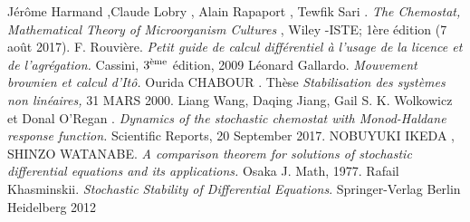 \documentclass[12pt,a4paper]{report}%
\begin{document}
\begin{mycomment}
\newpage
\begin{thebibliography}{Dillo 83}

  Jérôme Harmand ,Claude Lobry , Alain Rapaport , Tewfik Sari .\emph{ The Chemostat, Mathematical Theory of Microorganism Cultures }, Wiley -ISTE; 1ère édition (7 août 2017).
  F. Rouvière. \emph{ Petit guide de calcul différentiel à l'usage de la licence et de l'agrégation.} Cassini, $3\textsuperscript{ème}$ édition, 2009 
  Léonard Gallardo. \emph{ Mouvement brownien et calcul d'Itô.}
  Ourida CHABOUR . Thèse \emph{Stabilisation des systèmes non linéaires,} 31 MARS 2000.
  Liang Wang,  Daqing Jiang, Gail S. K. Wolkowicz et Donal O’Regan .  \emph{Dynamics of the stochastic chemostat with Monod-Haldane response function.} Scientific Reports, 20 September 2017.
 NOBUYUKI IKEDA , SHINZO WATANABE.  \emph{A comparison theorem for solutions of stochastic differential equations and its applications.} Osaka J. Math, 1977.
 Rafail Khasminskii.  \emph{Stochastic Stability of Differential Equations}. Springer-Verlag Berlin Heidelberg 2012

\end{thebibliography}
\end{mycomment}
\end{document}
